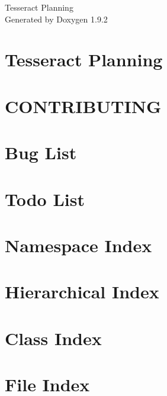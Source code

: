 \documentclass[twoside]{book}
\newcommand{\+}{\discretionary{\mbox{\scriptsize$\hookleftarrow$}}{}{}}
\newcommand{\clearemptydoublepage}{%
    \newpage{\pagestyle{empty}\cleardoublepage}%
  }
\begin{document}
  \raggedbottom
    \hypersetup{pageanchor=false,
                bookmarksnumbered=true,
                pdfencoding=unicode
               }
  \begin{titlepage}
  \vspace*{7cm}
  \begin{center}%
  {\Large Tesseract Planning}\\
  \vspace*{1cm}
  {\large Generated by Doxygen 1.9.2}\\
  \end{center}
  \end{titlepage}
  \clearemptydoublepage
  \tableofcontents
  \clearemptydoublepage
  \hypersetup{pageanchor=true}
\chapter{Tesseract Planning}
\label{index}\hypertarget{index}{}
\chapter{CONTRIBUTING}
\label{md_CONTRIBUTING}

\chapter{Bug List}
\label{bug}

\chapter{Todo List}
\label{todo}

\chapter{Namespace Index}

\chapter{Hierarchical Index}

\chapter{Class Index}

\chapter{File Index}

\end{document}
